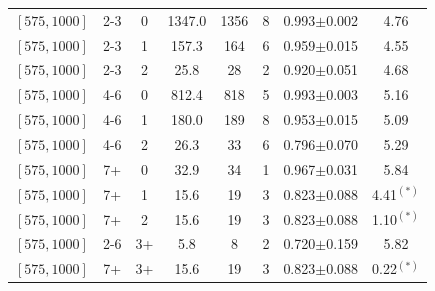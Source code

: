 \begin{table}
\begin{tabular}{c|c|c|c|c|c|c|c}
$[575,1000]$ &2-3&0&1347.0&1356&8&0.993$\pm$0.002&4.76\\
$[575,1000]$ &2-3&1&157.3&164&6&0.959$\pm$0.015&4.55\\
$[575,1000]$ &2-3&2&25.8&28&2&0.920$\pm$0.051&4.68\\
$[575,1000]$ &4-6&0&812.4&818&5&0.993$\pm$0.003&5.16\\
$[575,1000]$ &4-6&1&180.0&189&8&0.953$\pm$0.015&5.09\\
$[575,1000]$ &4-6&2&26.3&33&6&0.796$\pm$0.070&5.29\\
$[575,1000]$ &7+&0&32.9&34&1&0.967$\pm$0.031&5.84\\
$[575,1000]$ &7+&1&15.6&19&3&0.823$\pm$0.088&4.41$^{(*)}$\\
$[575,1000]$ &7+&2&15.6&19&3&0.823$\pm$0.088&1.10$^{(*)}$\\
$[575,1000]$ &2-6&3+&5.8&8&2&0.720$\pm$0.159&5.82\\
$[575,1000]$ &7+&3+&15.6&19&3&0.823$\pm$0.088&0.22$^{(*)}$\\
\hline \hline
	\end{tabular}
	\label{tbl:zinvCRs1}
\end{table}

